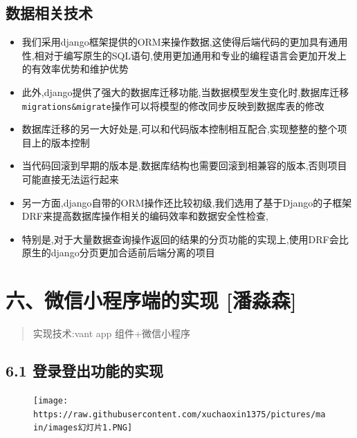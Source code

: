 \documentclass[
]{article}
\begin{document}
\hypertarget{ux6570ux636eux76f8ux5173ux6280ux672f}{%
\subsection{数据相关技术}\label{ux6570ux636eux76f8ux5173ux6280ux672f}}

\begin{itemize}
\item
  我们采用django框架提供的ORM来操作数据,这使得后端代码的更加具有通用性,相对于编写原生的SQL语句,使用更加通用和专业的编程语言会更加开发上的有效率优势和维护优势
\item
  此外,django提供了强大的数据库迁移功能,当数据模型发生变化时,数据库迁移\texttt{migrations\&migrate}操作可以将模型的修改同步反映到数据库表的修改
\item
  数据库迁移的另一大好处是,可以和代码版本控制相互配合,实现整整的整个项目上的版本控制
\item
  当代码回滚到早期的版本是,数据库结构也需要回滚到相兼容的版本,否则项目可能直接无法运行起来
\item
  另一方面,django自带的ORM操作还比较初级,我们选用了基于Django的子框架DRF来提高数据库操作相关的编码效率和数据安全性检查,
\item
  特别是,对于大量数据查询操作返回的结果的分页功能的实现上,使用DRF会比原生的django分页更加合适前后端分离的项目
\end{itemize}

\hypertarget{ux516dux5faeux4fe1ux5c0fux7a0bux5e8fux7aefux7684ux5b9eux73b0-ux6f58ux6dfcux68ee}{%
\section{六、微信小程序端的实现
{[}潘淼森{]}}\label{ux516dux5faeux4fe1ux5c0fux7a0bux5e8fux7aefux7684ux5b9eux73b0-ux6f58ux6dfcux68ee}}

\begin{quote}
实现技术:vant app 组件+微信小程序
\end{quote}

\hypertarget{61-ux767bux5f55ux767bux51faux529fux80fdux7684ux5b9eux73b0}{%
\subsection{6.1
登录登出功能的实现}\label{61-ux767bux5f55ux767bux51faux529fux80fdux7684ux5b9eux73b0}}

\begin{figure}
\centering
\texttt{[image: https://raw.githubusercontent.com/xuchaoxin1375/pictures/main/images幻灯片1.PNG]}
\caption{}
\end{figure}
\end{document}
